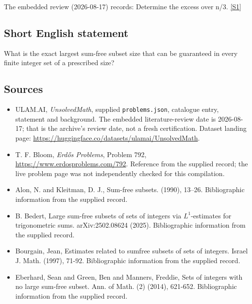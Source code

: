 \documentclass[11pt,a4paper]{article}
\newcommand{\sref}[2]{\hyperlink{source:#1:#2}{[S#2]}}
\begin{document}
The embedded review (2026-08-17) records: Determine the excess over n/3. \sref{statement}{1}

\subsection{Short English statement}

What is the exact largest sum-free subset size that can be guaranteed in every finite integer set of a prescribed size?

\subsection{Sources}

{\small

\begin{itemize}

\item[\hypertarget{source:statement:1}{S1}] ULAM.AI, \emph{UnsolvedMath}, supplied \texttt{problems.json}, catalogue entry, statement and background. The embedded literature-review date is 2026-08-17; that is the archive’s review date, not a fresh certification. Dataset landing page: \url{https://huggingface.co/datasets/ulamai/UnsolvedMath}.

\item[\hypertarget{source:statement:2}{S2}] T. F. Bloom, \emph{Erdős Problems}, Problem 792, \url{https://www.erdosproblems.com/792}. Reference from the supplied record; the live problem page was not independently checked for this compilation.

\item[\hypertarget{source:statement:3}{S3}] Alon, N. and Kleitman, D. J., Sum-free subsets. (1990), 13--26. Bibliographic information from the supplied record.

\item[\hypertarget{source:statement:4}{S4}] B. Bedert, Large sum-free subsets of sets of integers via $L^1$-estimates for trigonometric sums. arXiv:2502.08624 (2025). Bibliographic information from the supplied record.

\item[\hypertarget{source:statement:5}{S5}] Bourgain, Jean, Estimates related to sumfree subsets of sets of integers. Israel J. Math. (1997), 71-92. Bibliographic information from the supplied record.

\item[\hypertarget{source:statement:6}{S6}] Eberhard, Sean and Green, Ben and Manners, Freddie, Sets of integers with no large sum-free subset. Ann. of Math. (2) (2014), 621-652. Bibliographic information from the supplied record.

\end{itemize}

}

\label{end:statement}
\end{document}
